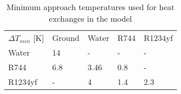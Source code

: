 \begin{table}[h!]
\centering
\caption{Minimum approach temperatures used for heat exchanges in the model}\vspace{2mm}
\label{tab:dtmins} 
\begin{tabular}{lllll}
\toprule
	$\Delta T_{min}$ [K] & Ground & Water & R744 & R1234yf \\
	Water                & 14     & -     & -    & -       \\
	R744                 & 6.8    & 3.46  & 0.8  & -       \\
	R1234yf              & -      & 4     & 1.4  & 2.3    \\ \bottomrule
\end{tabular}
\end{table}
